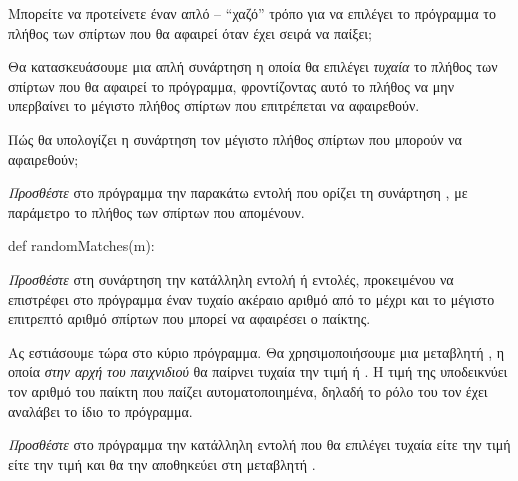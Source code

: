 \documentclass[a4paper,11pt,oneside]{book}
\begin{document}
\begin{step}
Μπορείτε να προτείνετε έναν απλό -- ``χαζό'' τρόπο για να επιλέγει το πρόγραμμα το πλήθος των σπίρτων που θα αφαιρεί όταν έχει σειρά να παίξει;

\marginnote[14pt]{\icondiscuss}
\dottedline


Θα κατασκευάσουμε μια απλή συνάρτηση η οποία θα επιλέγει \emph{τυχαία} το πλήθος των σπίρτων που θα αφαιρεί το πρόγραμμα, φροντίζοντας αυτό το πλήθος να μην υπερβαίνει το μέγιστο πλήθος σπίρτων που επιτρέπεται να αφαιρεθούν.

Πώς θα υπολογίζει η συνάρτηση τον μέγιστο πλήθος σπίρτων που μπορούν να αφαιρεθούν;

\marginnote[14pt]{\icondiscuss}
\dottedline

\emph{Προσθέστε} στο πρόγραμμα την παρακάτω εντολή που ορίζει τη συνάρτηση , με παράμετρο το πλήθος  των σπίρτων που απομένουν.

\begin{pynew}
def randomMatches(m):
\end{pynew}


\emph{Προσθέστε} στη συνάρτηση την κατάλληλη εντολή ή εντολές, προκειμένου να επιστρέφει στο πρόγραμμα έναν τυχαίο ακέραιο αριθμό από το  μέχρι και το μέγιστο επιτρεπτό αριθμό σπίρτων που μπορεί να αφαιρέσει ο παίκτης.
\end{step}

\begin{step}
Ας εστιάσουμε τώρα στο κύριο πρόγραμμα. Θα χρησιμοποιήσουμε μια μεταβλητή , η οποία \emph{στην αρχή του παιχνιδιού} θα παίρνει τυχαία την τιμή  ή . 
Η τιμή της  υποδεικνύει τον αριθμό του παίκτη που παίζει αυτοματοποιημένα, δηλαδή το ρόλο του τον έχει αναλάβει το ίδιο το πρόγραμμα.

\emph{Προσθέστε} στο πρόγραμμα την κατάλληλη εντολή που θα επιλέγει τυχαία είτε την τιμή  είτε την τιμή  και θα την αποθηκεύει στη μεταβλητή .
\end{step}
\end{document}
